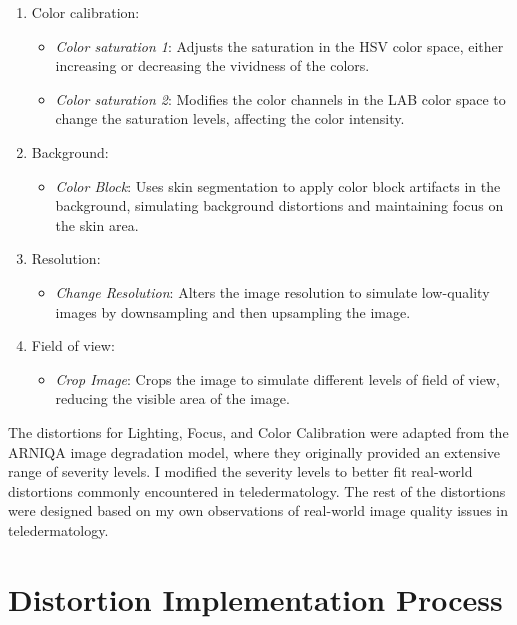\begin{enumerate}
\begin{itemize}
        \end{itemize}
    \item Color calibration:
        \begin{itemize}
            \item \textit{Color saturation 1}: Adjusts the saturation in the HSV color space, either increasing or decreasing the vividness of the colors.
            \item \textit{Color saturation 2}: Modifies the color channels in the LAB color space to change the saturation levels, affecting the color intensity.
        \end{itemize}
    \item Background:
        \begin{itemize}
            \item \textit{Color Block}: Uses skin segmentation to apply color block artifacts in the background, simulating background distortions and maintaining focus on the skin area.
        \end{itemize}
    \item Resolution:
        \begin{itemize}
            \item \textit{Change Resolution}: Alters the image resolution to simulate low-quality images by downsampling and then upsampling the image.
        \end{itemize}
    \item Field of view:
        \begin{itemize}
            \item \textit{Crop Image}: Crops the image to simulate different levels of field of view, reducing the visible area of the image.
        \end{itemize}
\end{enumerate}
\vspace{\baselineskip}
\noindent
The distortions for Lighting, Focus, and Color Calibration were adapted from the ARNIQA \autocite{ARNIQA} image degradation model, where they originally provided an extensive range of severity levels. I modified the severity levels to better fit real-world distortions commonly encountered in teledermatology. The rest of the distortions were designed based on my own observations of real-world image quality issues in teledermatology. \par

\section{Distortion Implementation Process}
\label{sec:DistProcess}

